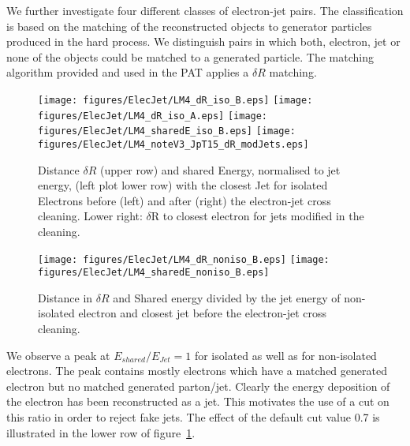 \documentclass{cmspaper}
\begin{document}
We further investigate four different classes of electron-jet pairs. The
classification is based on the matching of the reconstructed objects
to generator particles produced in the hard process. We distinguish pairs in
which both, electron, jet or none of the objects could be matched to a generated
particle. The matching algorithm provided and used in the PAT applies a $\delta
R$ matching.

\begin{figure}[hb]
\begin{center}
    \texttt{[image: figures/ElecJet/LM4\_dR\_iso\_B.eps]}
    \texttt{[image: figures/ElecJet/LM4\_dR\_iso\_A.eps]}
    \texttt{[image: figures/ElecJet/LM4\_sharedE\_iso\_B.eps]}
    \texttt{[image: figures/ElecJet/LM4\_noteV3\_JpT15\_dR\_modJets.eps]}
    \caption{Distance \(\delta R\) (upper row) and shared Energy, normalised to jet energy, (left plot lower row) with the closest Jet for isolated Electrons before (left) and after (right) the electron-jet cross cleaning. Lower right: $\delta$R to closest electron for jets modified in the cleaning.}
\label{fig:dR_sE_ElecJet_iso}
\end{center}
\end{figure}

\begin{figure}[hb]
\begin{center}
    \texttt{[image: figures/ElecJet/LM4\_dR\_noniso\_B.eps]}
    \texttt{[image: figures/ElecJet/LM4\_sharedE\_noniso\_B.eps]}
    \caption{Distance in $\delta R$ and Shared energy divided by the jet energy
    of non-isolated electron and closest jet before the electron-jet cross cleaning.}
\label{fig:dR_sE_ElecJet_noniso}
\end{center}
\end{figure}

We observe a peak at $E_{shared}/E_{Jet}=1$ for isolated as well as for
non-isolated electrons. The peak contains mostly electrons which have a matched
generated electron but no matched generated parton/jet. Clearly the energy
deposition of the electron has been reconstructed as a jet. This motivates the
use of a cut on this ratio in order to reject fake jets. The effect of the
default cut value 0.7 is illustrated in the lower row of
figure~\ref{fig:dR_sE_ElecJet_iso}.
\end{document}
